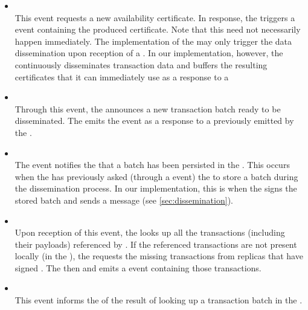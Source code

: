 \documentclass{article}
\begin{document}
\begin{itemize}

    \item {}\\
    This event requests a new availability certificate.
    In response, the  triggers a  event containing the produced certificate.
    Note that this need not necessarily happen immediately.
    The implementation of the  may only trigger the data dissemination upon reception of a .
    In our implementation, however, the  continuously disseminates transaction data
    and buffers the resulting certificates that it can immediately use as a response to a 

    \item {}\\
    Through this event, the  announces a new transaction batch ready to be disseminated.
    The  emits the  event as a response
    to a  previously emitted by the .

    \item {}\\
    The  event notifies the  that a batch has been persisted in the .
    This occurs when the  has previously asked (through a  event)
    the  to store a batch during the dissemination process.
    In our implementation, this is when the  signs the stored batch and sends a  message (see \cref{sec:dissemination}).

    \item {}\\
    Upon reception of this event, the  looks up all the transactions (including their payloads) referenced by .
    If the referenced transactions are not present locally (in the ),
    the  requests the missing transactions from replicas that have signed .
    The  then and emits a  event containing those transactions.
    
    \item {}\\
    This event informs the  of the result of looking up a transaction batch in the .

\end{itemize}
\end{document}
